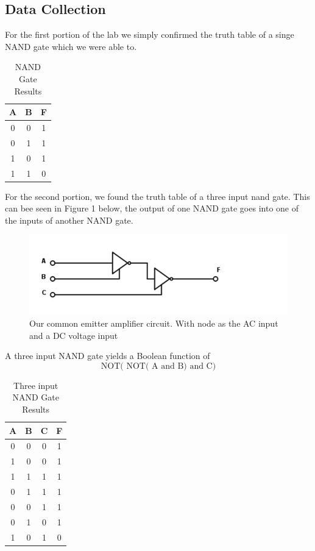 \documentclass[11pt,letterpaper,onecolumn]{article}
\begin{document}
\subsection{Data Collection}

For the first portion of the lab we simply confirmed the truth table of a singe NAND gate which we were able to.

\begin{table}[H]
\centering
\begin{tabular}{|c|c|c|}
 \hline
 A & B & F \\\hline
 0 & 0 & 1 \\
 0 & 1 & 1 \\
 1 & 0 & 1 \\
 1 & 1 & 0 \\
  \hline

\end{tabular}
\caption{NAND Gate Results}
\label{tab:data}
\end{table}

For the second portion, we found the truth table of a three input nand gate. This can bee seen in Figure 1 below, the output of one NAND gate goes into one of the inputs of another NAND gate.  

\begin{figure}[H]
    \centering
    \includegraphics{Triput.pdf}
    \caption{Our common emitter amplifier circuit. With node as the AC input and a DC voltage input}
    \label{fig:my_label}
\end{figure} 
A three input NAND gate yields a Boolean function of
$$\text{NOT( NOT( A and B) and C)}$$


\begin{table}[H]
\centering
\begin{tabular}{|c|c|c|c|}
 \hline
 A & B & C & F \\\hline
 0 & 0 & 0 & 1\\
 1 & 0 & 0 & 1\\
 1 & 1 & 1 & 1\\
 0 & 1 & 1 & 1\\
 0 & 0 & 1 & 1\\
 0 & 1 & 0 & 1\\
 1 & 0 & 1 & 0\\
 
  \hline

\end{tabular}
\caption{Three input NAND Gate Results}
\label{tab:data1}
\end{table}
\end{document}
